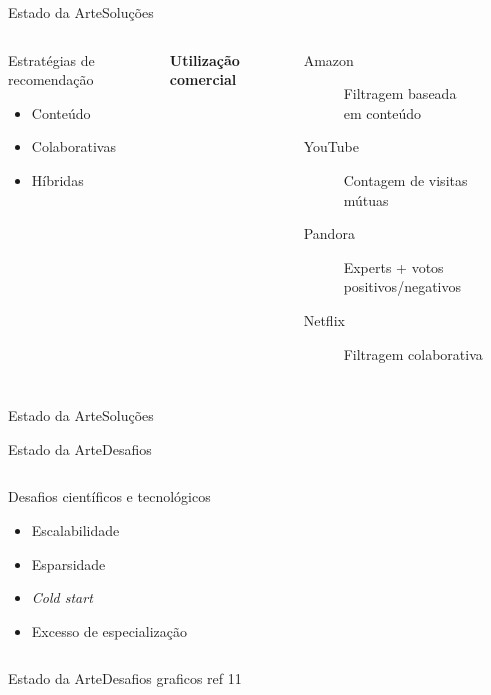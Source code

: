 \begin{frame}{Estado da Arte}{Soluções}
\begin{columns}[c]
\begin{block}{Estratégias de recomendação}
\begin{itemize}
	\item Conteúdo
	\item Colaborativas
	\item Híbridas
\end{itemize}
\end{block}





\textbf{Utilização comercial} \\ \cite{chiang2012networked}

\begin{description}
\item[Amazon] Filtragem baseada \\ em conteúdo
\item[YouTube] Contagem de visitas mútuas
\item[Pandora] Experts + votos positivos/negativos
\item[Netflix] Filtragem colaborativa
\end{description}
\end{columns}
\end{frame}


\begin{frame}{Estado da Arte}{Soluções}
\end{frame}


\begin{frame}{Estado da Arte}{Desafios}
\begin{columns}[c]

\begin{block}{Desafios científicos e tecnológicos}
\begin{itemize}
	\item Escalabilidade
	\item Esparsidade
	\item \textit{Cold start}
	\item Excesso de especialização
\end{itemize}
\end{block}

\end{columns}
\end{frame}


\begin{frame}{Estado da Arte}{Desafios}
graficos ref 11
\end{frame}

